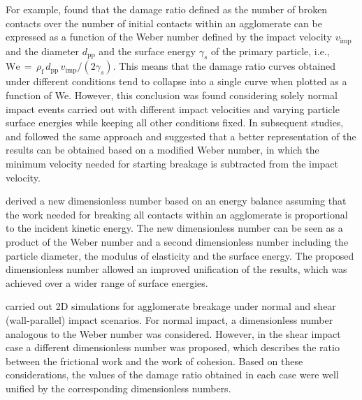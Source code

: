 For example, \citet{kafui1993powders} found that the damage ratio
defined as the number of broken contacts over the number of initial
contacts within an agglomerate can be expressed as a function of the
Weber number defined by the impact velocity $v_{\text{imp}}$ and the
diameter $d_\text{pp}$ and the surface energy $\gamma_s$ of the
primary particle, i.e., $\text{We} \, = \, \rho_\text{f} \,
d_{\text{pp}} \, v_{\text{imp}} /(2 \gamma_s)$.  This means that the
damage ratio curves obtained under different conditions tend to
collapse into a single curve when plotted as a function of
We. However, this conclusion was found considering solely normal
impact events carried out with different impact velocities and varying
particle surface energies while keeping all other conditions fixed. In
subsequent studies, \citet{thornton1996numerical} and
\citet{subero1999effect} followed the same approach and suggested that
a better representation of the results can be obtained based on a
modified Weber number, in which the minimum velocity needed for
starting breakage is subtracted from the impact velocity.

\citet{moreno2006mechanistic} derived a new dimensionless number based
on an energy balance assuming that the work needed for breaking all
contacts within an agglomerate is proportional to the incident kinetic
energy. The new dimensionless number can be seen as a product of the
Weber number and a second dimensionless number including the particle
diameter, the modulus of elasticity and the surface energy.  The
proposed dimensionless number allowed an improved unification of the
results, which was achieved over a wider range of surface energies.

\citet{le2011aggregate} carried out 2D simulations for agglomerate
breakage under normal and shear (wall-parallel) impact scenarios.  For
normal impact, a dimensionless number analogous to the Weber number
was considered. However, in the shear impact case a different
dimensionless number was proposed, which describes the ratio between
the frictional work and the work of cohesion. Based on these
considerations, the values of the damage ratio obtained in each case
were well unified by the corresponding dimensionless numbers. 
\newline 

